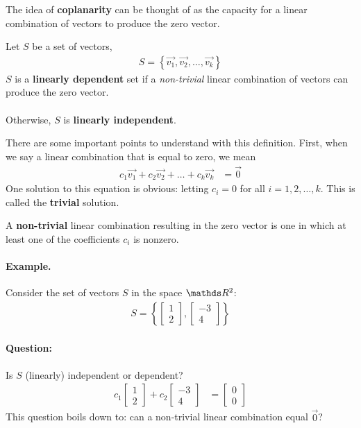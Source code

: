 \documentclass[11pt]{article}
\newcommand{\ques}{\paragraph{Question:}}
\newcommand{\keyphrase}{\textbf}
\newcommand{\vek}[1]{\vec{#1}}
\begin{document}
The idea of \keyphrase{coplanarity} can be thought of as the capacity for a linear combination of vectors to produce the zero vector.

\begin{minipage}{.95\textwidth}
Let $S$ be a set of vectors,
\begin{align*}
S = \left\{\vek{v_1}, \vek{v_2}, \dots, \vek{v_k}\right\}
\end{align*}
$S$ is a \keyphrase{linearly dependent} set if a \emph{non-trivial} linear combination of vectors can produce the zero vector.
\\
\\
Otherwise, $S$ is \keyphrase{linearly independent}.
\end{minipage}


There are some important points to understand with this definition. First, when we say a linear combination that is equal to zero, we mean
\begin{align*}
c_1 \vek{v_1} + c_2 \vek{v_2} + \dots + c_k \vek{v_k} &= \vek{0}
\end{align*}
One solution to this equation is obvious: letting $c_i = 0$ for all $i=1,2,\dots,k$. This is called the \keyphrase{trivial} solution.

A \keyphrase{non-trivial} linear combination resulting in the zero vector is one in which at least one of the coefficients $c_i$ is nonzero.

\paragraph{Example.}
Consider the set of vectors $S$ in the space $\bbR^2$:
\begin{align*}
S = \left\{ \begin{bmatrix}1\\2\end{bmatrix}, \begin{bmatrix}-3\\4\end{bmatrix} \right\}
\end{align*}

\ques Is $S$ (linearly) independent or dependent?
\begin{align*}
c_1 \begin{bmatrix}1\\2\end{bmatrix} +
c_2 \begin{bmatrix}-3\\4\end{bmatrix}
&= \begin{bmatrix}0\\0\end{bmatrix}
\end{align*}
This question boils down to: can a non-trivial linear combination equal $\vek{0}$?
\end{document}
